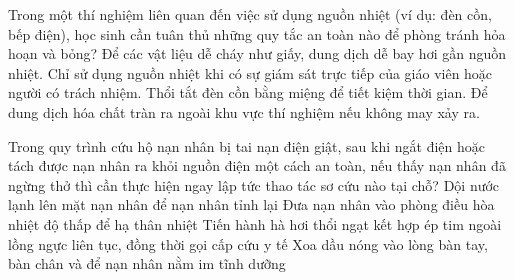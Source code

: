 \begin{ex}
Trong một thí nghiệm liên quan đến việc sử dụng nguồn nhiệt (ví dụ: đèn cồn, bếp điện), học sinh cần tuân thủ những quy tắc an toàn nào để phòng tránh hỏa hoạn và bỏng?
\choice
{Để các vật liệu dễ cháy như giấy, dung dịch dễ bay hơi gần nguồn nhiệt.}
{\True Chỉ sử dụng nguồn nhiệt khi có sự giám sát trực tiếp của giáo viên hoặc người có trách nhiệm.}
{Thổi tắt đèn cồn bằng miệng để tiết kiệm thời gian.}
{Để dung dịch hóa chất tràn ra ngoài khu vực thí nghiệm nếu không may xảy ra.}
\end{ex}

\begin{ex}
Trong quy trình cứu hộ nạn nhân bị tai nạn điện giật, sau khi ngắt điện hoặc tách được nạn nhân ra khỏi nguồn điện một cách an toàn, nếu thấy nạn nhân đã ngừng thở thì cần thực hiện ngay lập tức thao tác sơ cứu nào tại chỗ?
\choice
{Dội nước lạnh lên mặt nạn nhân để nạn nhân tỉnh lại}
{Đưa nạn nhân vào phòng điều hòa nhiệt độ thấp để hạ thân nhiệt}
{\True Tiến hành hà hơi thổi ngạt kết hợp ép tim ngoài lồng ngực liên tục, đồng thời gọi cấp cứu y tế}
{Xoa dầu nóng vào lòng bàn tay, bàn chân và để nạn nhân nằm im tĩnh dưỡng}
\end{ex}

